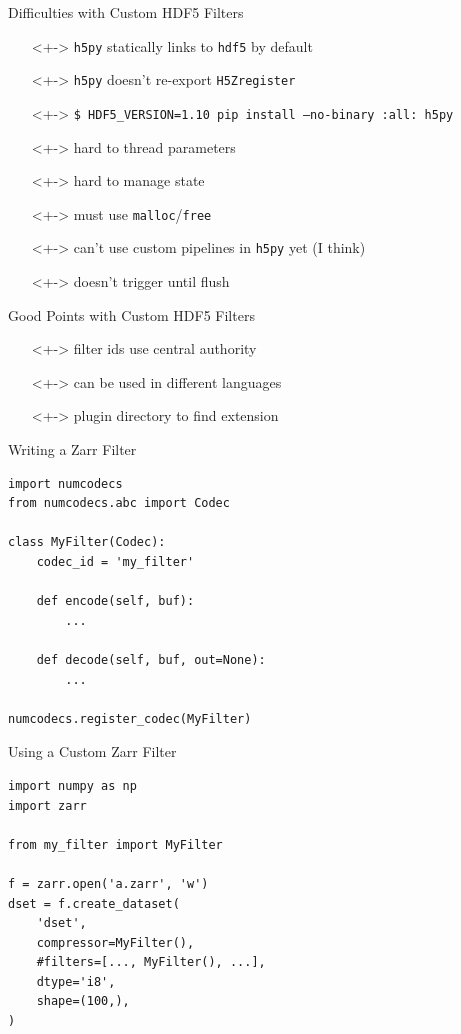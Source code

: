 \documentclass{beamer}
\begin{document}
\begin{frame}{Difficulties with Custom HDF5 Filters}
  \begin{itemize}
  \item[]<+-> \texttt{h5py} statically links to \texttt{hdf5} by default
  \item[]<+-> \texttt{h5py} doesn't re-export \texttt{H5Zregister}
  \item[]<+-> \texttt{\$ HDF5\_VERSION=1.10 pip install --no-binary :all: h5py}
  \item[]<+-> hard to thread parameters
  \item[]<+-> hard to manage state
  \item[]<+-> must use \texttt{malloc}/\texttt{free}
  \item[]<+-> can't use custom pipelines in \texttt{h5py} yet (I think)
  \item[]<+-> doesn't trigger until flush
  \end{itemize}
\end{frame}

\begin{frame}{Good Points with Custom HDF5 Filters}
  \begin{itemize}
  \item[]<+-> filter ids use central authority
  \item[]<+-> can be used in different languages
  \item[]<+-> plugin directory to find extension
  \end{itemize}
\end{frame}

\begin{frame}[fragile]{Writing a Zarr Filter}
  \begin{verbatim}
import numcodecs
from numcodecs.abc import Codec

class MyFilter(Codec):
    codec_id = 'my_filter'

    def encode(self, buf):
        ...

    def decode(self, buf, out=None):
        ...

numcodecs.register_codec(MyFilter)
  \end{verbatim}
\end{frame}

\begin{frame}[fragile]{Using a Custom Zarr Filter}
  \begin{verbatim}
import numpy as np
import zarr

from my_filter import MyFilter

f = zarr.open('a.zarr', 'w')
dset = f.create_dataset(
    'dset',
    compressor=MyFilter(),
    #filters=[..., MyFilter(), ...],
    dtype='i8',
    shape=(100,),
)
  \end{verbatim}
\end{frame}
\end{document}
